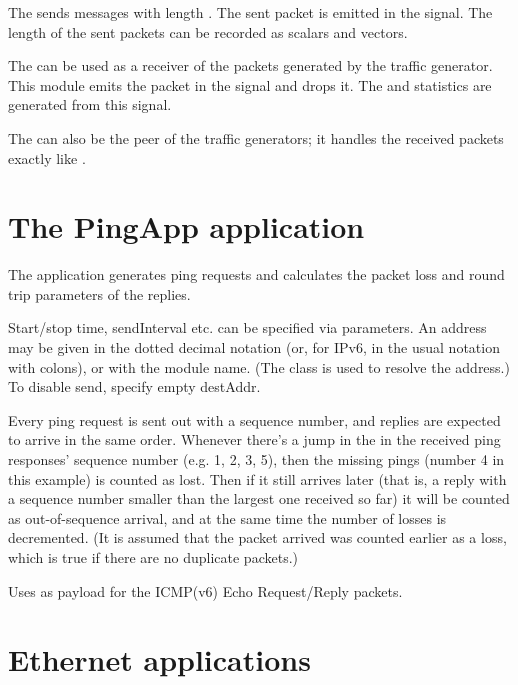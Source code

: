 The  sends messages with length .
The sent packet is emitted in the  signal.
The length of the sent packets can be recorded as scalars and vectors.

The  can be used as a receiver of the packets
generated by the traffic generator. This module emits the packet
in the  signal and drops it. The 
and  statistics are generated from this signal.

The  can also be the peer of the traffic generators;
it handles the received packets exactly like .

\section{The PingApp application}
\label{sec:apps:the-pingapp-application}

The  application
generates ping requests and calculates the packet loss and round trip
parameters of the replies.

Start/stop time, sendInterval etc. can be specified via parameters. An address
may be given in the dotted decimal notation (or, for IPv6, in the usual
notation with colons), or with the module name.
(The  class is used to resolve the address.)
To disable send, specify empty destAddr.

Every ping request is sent out with a sequence number, and replies are
expected to arrive in the same order. Whenever there's a jump in the
in the received ping responses' sequence number (e.g. 1, 2, 3, 5), then
the missing pings (number 4 in this example) is counted as lost.
Then if it still arrives later (that is, a reply with a sequence number
smaller than the largest one received so far) it will be counted as
out-of-sequence arrival, and at the same time the number of losses is
decremented. (It is assumed that the packet arrived was counted earlier as a loss,
which is true if there are no duplicate packets.)

Uses  as payload for the ICMP(v6) Echo Request/Reply packets.


\section{Ethernet applications}
\label{sec:apps:ethernet-applications}

